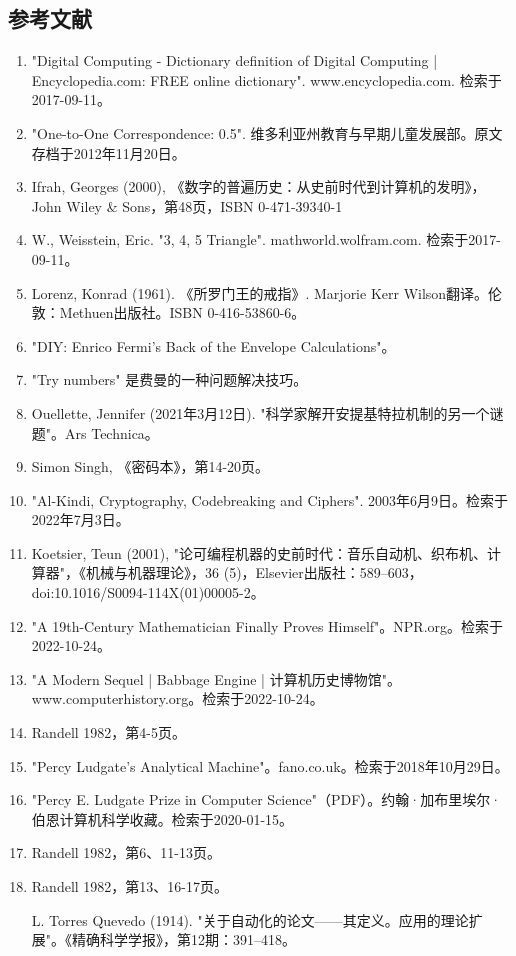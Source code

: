 \subsection{参考文献}
\begin{enumerate}
\item "Digital Computing - Dictionary definition of Digital Computing | Encyclopedia.com: FREE online dictionary". www.encyclopedia.com. 检索于2017-09-11。
\item "One-to-One Correspondence: 0.5". 维多利亚州教育与早期儿童发展部。原文存档于2012年11月20日。
\item Ifrah, Georges (2000), 《数字的普遍历史：从史前时代到计算机的发明》，John Wiley & Sons，第48页，ISBN 0-471-39340-1
\item W., Weisstein, Eric. "3, 4, 5 Triangle". mathworld.wolfram.com. 检索于2017-09-11。
\item Lorenz, Konrad (1961). 《所罗门王的戒指》. Marjorie Kerr Wilson翻译。伦敦：Methuen出版社。ISBN 0-416-53860-6。
\item "DIY: Enrico Fermi's Back of the Envelope Calculations"。
\item "Try numbers" 是费曼的一种问题解决技巧。
\item Ouellette, Jennifer (2021年3月12日). "科学家解开安提基特拉机制的另一个谜题"。Ars Technica。
\item Simon Singh, 《密码本》，第14-20页。
\item "Al-Kindi, Cryptography, Codebreaking and Ciphers". 2003年6月9日。检索于2022年7月3日。
\item Koetsier, Teun (2001), "论可编程机器的史前时代：音乐自动机、织布机、计算器"，《机械与机器理论》，36 (5)，Elsevier出版社：589–603，doi:10.1016/S0094-114X(01)00005-2。
\item "A 19th-Century Mathematician Finally Proves Himself"。NPR.org。检索于2022-10-24。
\item "A Modern Sequel | Babbage Engine | 计算机历史博物馆"。www.computerhistory.org。检索于2022-10-24。
\item Randell 1982，第4-5页。
\item "Percy Ludgate's Analytical Machine"。fano.co.uk。检索于2018年10月29日。
\item "Percy E. Ludgate Prize in Computer Science"（PDF）。约翰·加布里埃尔·伯恩计算机科学收藏。检索于2020-01-15。
\item Randell 1982，第6、11-13页。
\item Randell 1982，第13、16-17页。

L. Torres Quevedo (1914). "关于自动化的论文——其定义。应用的理论扩展"。《精确科学学报》，第12期：391–418。


\end{enumerate}
